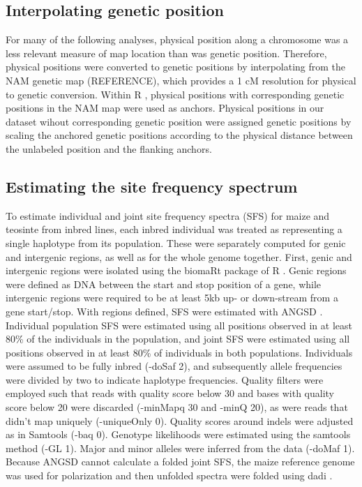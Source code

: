\documentclass{pnastwo}
\begin{document}
\begin{article}
\begin{materials}
\subsection{Interpolating genetic position}
For many of the following analyses, physical position along a
chromosome was a less relevant measure of map location than was genetic
position. Therefore, physical positions were converted to genetic
positions by interpolating from the NAM genetic map (REFERENCE), which
provides a 1 cM resolution for physical to genetic conversion. Within
R \cite{R2014}, physical positions with corresponding genetic positions in
the NAM map were used as anchors. Physical positions in our dataset
wihout corresponding genetic position were assigned genetic positions by scaling
the anchored genetic positions according to the physical distance
between the unlabeled position and the flanking anchors.

\subsection{Estimating the site frequency spectrum}
To estimate individual  and joint site frequency spectra (SFS) for
maize and teosinte from inbred lines, each inbred individual was treated as representing
a single haplotype from its population. These were
separately computed for genic and intergenic regions, as well as for
the whole genome together. First, genic and intergenic regions were isolated using
the biomaRt package \cite{durinck2009,durinck2005} of R \cite{R2014}. Genic
regions were defined as DNA between the start and stop position of a
gene, while intergenic regions were required to be at least 5kb up- or
down-stream from a gene start/stop. With regions defined, SFS were
estimated with ANGSD \cite{korneliussen2014}. Individual population SFS were
estimated using all positions observed in at least 80\% of the
individuals in the population, and joint SFS were estimated using all
positions observed in at least 80\% of individuals in both
populations. Individuals were
assumed to be fully inbred (-doSaf 2), and subsequently allele frequencies were
divided by two to indicate haplotype frequencies. Quality filters were
employed such that reads with quality score below 30 and bases with
quality score below 20 were discarded (-minMapq 30 and -minQ 20), as were reads that didn't map
uniquely (-uniqueOnly 0). Quality scores around indels were adjusted
as in Samtools (-baq 0). Genotype likelihoods were estimated using the samtools
method (-GL 1). Major and minor alleles were inferred from the data
(-doMaf 1). Because ANGSD cannot calculate a folded joint SFS, the
maize reference genome was used for polarization and then unfolded spectra
were folded using dadi \cite{gutenkunst2009}.


\end{materials}
\end{article}
\end{document}

